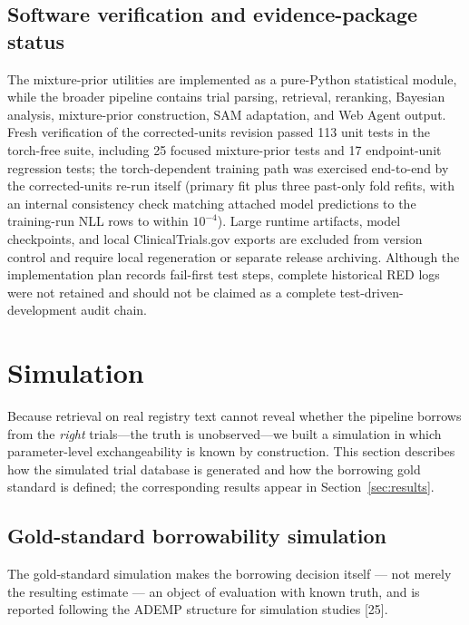\documentclass[11pt]{article}
\begin{document}
\subsection{Software verification and evidence-package status}
The mixture-prior utilities are implemented as a pure-Python statistical
module, while the broader pipeline contains trial parsing, retrieval,
reranking, Bayesian analysis, mixture-prior construction, SAM adaptation, and
Web Agent output. Fresh verification of the corrected-units revision passed
113 unit tests in the torch-free suite, including 25 focused mixture-prior
tests and 17 endpoint-unit regression tests; the torch-dependent training path
was exercised end-to-end by the corrected-units re-run itself (primary fit plus
three past-only fold refits, with an internal consistency check matching
attached model predictions to the training-run NLL rows to within $10^{-4}$).
Large runtime artifacts, model checkpoints,
and local ClinicalTrials.gov exports are excluded from version control and
require local regeneration or separate release archiving. Although the
implementation plan records fail-first test steps, complete historical RED
logs were not retained and should not be claimed as a complete
test-driven-development audit chain.


\section{Simulation}
\label{sec:simulation}
Because retrieval on real registry text cannot reveal whether the pipeline
borrows from the \emph{right} trials---the truth is unobserved---we built a
simulation in which parameter-level exchangeability is known by construction.
This section describes how the simulated trial database is generated and how
the borrowing gold standard is defined; the corresponding results appear in
Section~\ref{sec:results}.
\subsection{Gold-standard borrowability simulation}
\label{sec:goldsim}
The gold-standard simulation makes the borrowing decision itself --- not
merely the resulting estimate --- an object of evaluation with known truth,
and is reported following the ADEMP structure for simulation studies [25].
\end{document}
